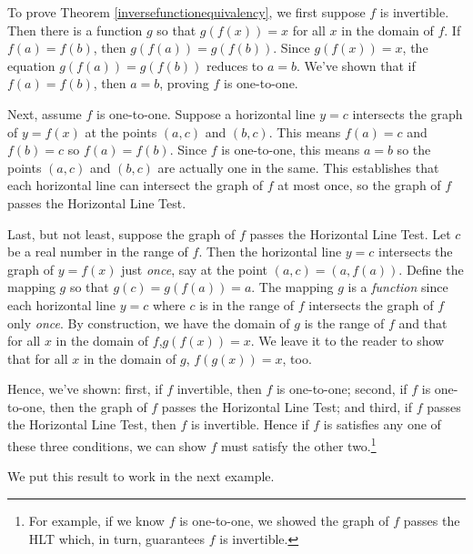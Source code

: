 To prove Theorem \ref{inversefunctionequivalency}, we first suppose $f$ is invertible.  Then there is a function $g$ so that $g(f(x)) = x$ for all $x$ in the domain of $f$.    If $f(a) = f(b)$, then $g(f(a)) = g(f(b))$.  Since $g(f(x)) = x$, the equation $g(f(a)) = g(f(b))$ reduces to $a = b$. We've shown that if $f(a) = f(b)$, then $a = b$, proving $f$ is one-to-one.

\smallskip

Next, assume $f$ is one-to-one.  Suppose a horizontal line $y=c$ intersects the graph of $y = f(x)$ at the points $(a,c)$ and $(b,c)$.  This means $f(a) = c$ and $f(b) = c$ so $f(a) = f(b)$.  Since $f$ is one-to-one, this means $a=b$ so the points $(a,c)$ and $(b,c)$ are actually one in the same.  This establishes that each horizontal line can intersect the graph of $f$ at most once, so the graph of $f$ passes the Horizontal Line Test.

\smallskip

Last, but not least, suppose the graph of $f$ passes the Horizontal Line Test.  Let  $c$ be a real number in the range of $f$.  Then the horizontal line $y=c$ intersects the graph of $y=f(x)$ just \textit{once}, say at the point $(a,c) = (a, f(a))$.  Define the mapping $g$ so that $g(c) = g(f(a)) = a$.  The mapping $g$ is a \textit{function} since each horizontal line $y=c$ where $c$ is in the range of $f$ intersects the graph of $f$ only \textit{once}.  By construction, we have the domain of $g$ is the range of $f$ and that for all $x$ in the domain of $f$,$g(f(x)) = x$.  We leave it to the reader to show that for all $x$ in the domain of $g$, $f(g(x)) = x$, too.

\smallskip

Hence, we've shown:  first,  if $f$ invertible, then $f$ is one-to-one; second,   if $f$ is one-to-one, then the graph of $f$ passes the Horizontal Line Test; and third,  if $f$ passes the Horizontal Line Test, then $f$ is invertible.  Hence if $f$ is satisfies any one of these three conditions, we can show $f$ must satisfy the other two.\footnote{For example, if we know $f$ is one-to-one, we showed the graph of $f$ passes the HLT which, in turn, guarantees $f$ is invertible.}

\smallskip

We put this result to work in the next example.

\smallskip

